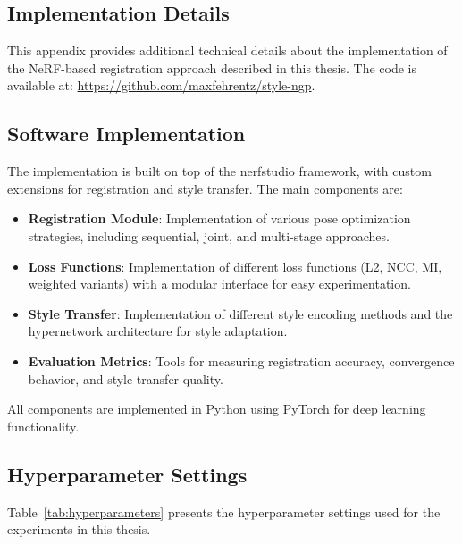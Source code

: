 \begin{appendices}

\chapter{Implementation Details}\label{appendix:implementation}

This appendix provides additional technical details about the implementation of the NeRF-based registration approach described in this thesis. The code is available at: \url{https://github.com/maxfehrentz/style-ngp}.

\section{Software Implementation}

The implementation is built on top of the nerfstudio framework, with custom extensions for registration and style transfer. The main components are:

\begin{itemize}
    \item \textbf{Registration Module}: Implementation of various pose optimization strategies, including sequential, joint, and multi-stage approaches.
    
    \item \textbf{Loss Functions}: Implementation of different loss functions (L2, NCC, MI, weighted variants) with a modular interface for easy experimentation.
    
    \item \textbf{Style Transfer}: Implementation of different style encoding methods and the hypernetwork architecture for style adaptation.
    
    \item \textbf{Evaluation Metrics}: Tools for measuring registration accuracy, convergence behavior, and style transfer quality.
\end{itemize}

All components are implemented in Python using PyTorch for deep learning functionality.

\section{Hyperparameter Settings}\label{appendix:hyperparameters}

Table~\ref{tab:hyperparameters} presents the hyperparameter settings used for the experiments in this thesis.


\end{appendices}
